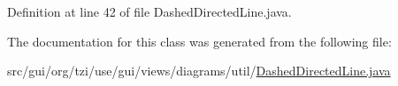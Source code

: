 Definition at line 42 of file Dashed\-Directed\-Line.\-java.



The documentation for this class was generated from the following file\-:\begin{DoxyCompactItemize}
\item 
src/gui/org/tzi/use/gui/views/diagrams/util/\hyperlink{_dashed_directed_line_8java}{Dashed\-Directed\-Line.\-java}\end{DoxyCompactItemize}
